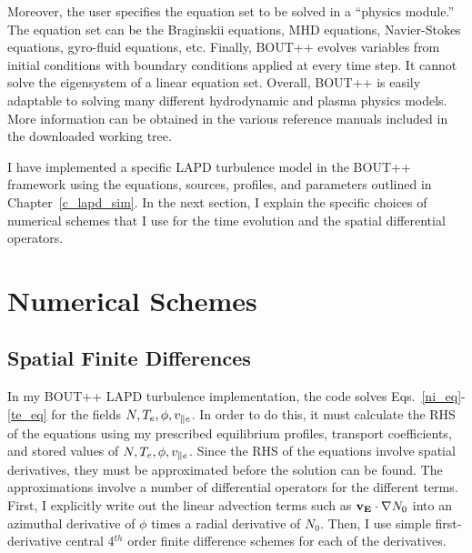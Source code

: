 Moreover, the user specifies the equation set to be solved in a ``physics module.'' The equation set can be 
the Braginskii equations, MHD equations, Navier-Stokes equations, gyro-fluid equations, etc.
Finally, BOUT++ evolves variables from initial conditions with boundary conditions applied at every time step. It cannot solve the eigensystem of a linear equation set.
Overall, BOUT++ is easily adaptable to solving many different hydrodynamic and plasma physics models. More information can be obtained in the various reference manuals included in the downloaded
working tree. 

I have implemented a specific LAPD turbulence model in the BOUT++ framework using the equations,
sources, profiles, and parameters outlined in Chapter~\ref{c_lapd_sim}. In the next section, I explain the specific choices of numerical schemes that I use for the time evolution and the spatial
differential operators.

\section{Numerical Schemes}
\label{s_numerical_schemes}

\subsection{Spatial Finite Differences}
\label{ss_sp_finite_dffs}

In my BOUT++ LAPD turbulence implementation, the code solves Eqs.~\ref{ni_eq}-\ref{te_eq} for the fields $N, T_e, \phi, v_{\parallel e}$. In order to do this, it must calculate the RHS of the equations
using my prescribed equilibrium profiles, transport coefficients, and stored values of $N, T_e, \phi, v_{\parallel e}$.
Since the RHS of the equations involve spatial derivatives, they must be approximated before the solution can be found. The approximations involve a number of differential operators for the different
terms. First, I explicitly write out the linear advection terms such as ${\bf v_E} \cdot \nabla N_0$ into an azimuthal derivative of $\phi$ times a radial derivative of $N_0$. Then, I
use simple first-derivative central 4$^{th}$ order finite difference schemes for each of the derivatives. 


